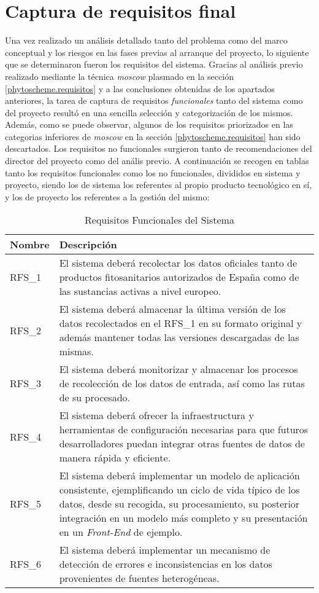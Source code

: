 \section{Captura de requisitos final}  \label{analisis.requisitos}
Una vez realizado un análisis detallado tanto del problema como del marco conceptual y los riesgos en las fases previas al arranque del proyecto, lo  siguiente que se determinaron fueron los requisitos del sistema. Gracias al análisis previo realizado mediante la técnica \textit{\gls{moscow}} plasmado en la sección \ref{phytoscheme.requisitos} y a las conclusiones obtenidas de los apartados anteriores, la tarea de captura de requisitos \textit{funcionales} tanto del sistema como del proyecto resultó en una sencilla selección y categorización de los mismos. Además, como se puede observar, algunos de los requisitos priorizados en las categorias inferiores de \textit{\gls{moscow}} en la sección \ref{phytoscheme.requisitos} han sido descartados. Los requisitos no funcionales surgieron tanto de recomendaciones del director del proyecto como del anális previo. A continuación se recogen en tablas tanto los requisitos funcionales como los no funcionales, divididos en sistema y proyecto, siendo los de sistema los referentes al propio producto tecnológico en sí, y los de proyecto los referentes a la gestión del mismo: \par
\begin{table}[!h]
\centering
\bgroup
\def\arraystretch{1.3}
\begin{tabular}{l p{13cm}}
\toprule
\textbf{Nombre} & \textbf{Descripción} \\
 \midrule
RFS\_1 & 
El sistema deberá recolectar los datos oficiales tanto de productos fitosanitarios autorizados de España como de las sustancias activas a nivel europeo.
 \\
RFS\_2 & 
El sistema deberá almacenar la última versión de los datos recolectados en el RFS\_1 en su formato original y además mantener todas las versiones descargadas de las mismas. 
 \\
RFS\_3 & 
El sistema deberá monitorizar y almacenar los procesos de recolección de los datos de entrada, así como las rutas de su procesado. 
 \\
RFS\_4 & 
El sistema deberá ofrecer la infraestructura y herramientas de configuración necesarias para que futuros desarrolladores puedan integrar otras fuentes de datos de manera rápida y eficiente. 
 \\
RFS\_5 & 
El sistema deberá implementar un modelo de aplicación consistente, ejemplificando un ciclo de vida típico de los datos, desde su recogida, su procesamiento, su posterior integración en un modelo más completo y su presentación en un \textit{Front-End} de ejemplo.
 \\
RFS\_6 & 
El sistema deberá implementar un mecanismo de detección de errores e inconsistencias en los datos provenientes de fuentes heterogéneas.
 \\
\bottomrule
\end{tabular}
\egroup
\caption{Requisitos Funcionales del Sistema}
\label{tab:req_func_sist}
\end{table}



